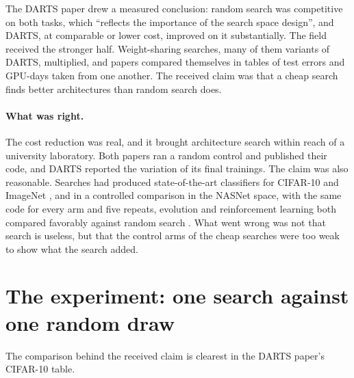 \begin{refsection}
The DARTS paper drew a measured conclusion: random search was competitive on both tasks, which ``reflects the importance of the search space design'', and DARTS, at comparable or lower cost, improved on it substantially. The field received the stronger half. Weight-sharing searches, many of them variants of DARTS, multiplied, and papers compared themselves in tables of test errors and GPU-days taken from one another. The received claim was that a cheap search finds better architectures than random search does.

\paragraph{What was right.} The cost reduction was real, and it brought architecture search within reach of a university laboratory. Both papers ran a random control and published their code, and DARTS reported the variation of its final trainings. The claim was also reasonable. Searches had produced state-of-the-art classifiers for CIFAR-10 and ImageNet \parencite{ZophEtAl2018,RealEtAl2019}, and in a controlled comparison in the NASNet space, with the same code for every arm and five repeats, evolution and reinforcement learning both compared favorably against random search \parencite{RealEtAl2019}. What went wrong was not that search is useless, but that the control arms of the cheap searches were too weak to show what the search added.

\section{The experiment: one search against one random draw}\label{sec:controls:experiment}

The comparison behind the received claim is clearest in the DARTS paper's CIFAR-10 table.

\begin{experiment}
\end{experiment}


\end{refsection}
